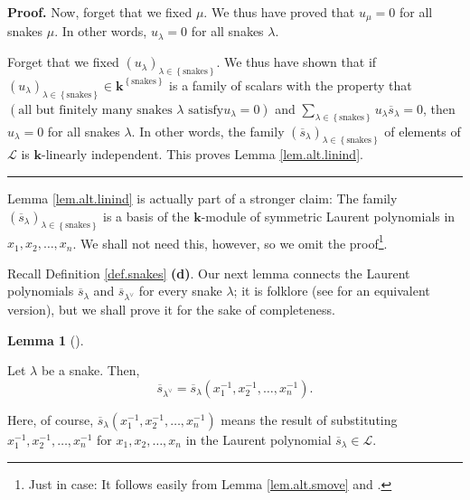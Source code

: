\documentclass[numbers=enddot,12pt,final,onecolumn,notitlepage]{scrartcl}%
\theoremstyle{definition}
\newtheorem{lem}[theo]{Lemma}
\newenvironment{lemma}[1][]
{\begin{lem}[#1]\begin{leftbar}}
{\end{leftbar}\end{lem}}
\newenvironment{proof}[1][Proof]{\noindent\textbf{#1.} }{\ \rule{0.5em}{0.5em}}
\let\sumnonlimits\sum
\renewcommand{\sum}{\sumnonlimits\limits}
\begin{document}
\begin{proof}
Now, forget that we fixed $\mu$. We thus have proved that $u_{\mu}=0$ for all
snakes $\mu$. In other words, $u_{\lambda}=0$ for all snakes $\lambda$.

Forget that we fixed $\left(  u_{\lambda}\right)  _{\lambda\in\left\{
\text{snakes}\right\}  }$. We thus have shown that if $\left(  u_{\lambda
}\right)  _{\lambda\in\left\{  \text{snakes}\right\}  }\in\mathbf{k}^{\left\{
\text{snakes}\right\}  }$ is a family of scalars with the property that
\newline$\left(  \text{all but finitely many snakes }\lambda\text{ satisfy
}u_{\lambda}=0\right)  $ and $\sum_{\lambda\in\left\{  \text{snakes}\right\}
}u_{\lambda}\overline{s}_{\lambda}=0$, then $u_{\lambda}=0$ for all snakes
$\lambda$. In other words, the family $\left(  \overline{s}_{\lambda}\right)
_{\lambda\in\left\{  \text{snakes}\right\}  }$ of elements of $\mathcal{L}$ is
$\mathbf{k}$-linearly independent. This proves Lemma \ref{lem.alt.linind}.
\end{proof}

Lemma \ref{lem.alt.linind} is actually part of a stronger claim: The family
$\left(  \overline{s}_{\lambda}\right)  _{\lambda\in\left\{  \text{snakes}%
\right\}  }$ is a basis of the $\mathbf{k}$-module of symmetric Laurent
polynomials in $x_{1},x_{2},\ldots,x_{n}$. We shall not need this, however, so
we omit the proof\footnote{Just in case: It follows easily from Lemma
\ref{lem.alt.smove} and \cite[Remark 2.3.9(d)]{GriRei}.}.

Recall Definition \ref{def.snakes} \textbf{(d)}. Our next lemma connects the
Laurent polynomials $\overline{s}_{\lambda}$ and $\overline{s}_{\lambda^{\vee
}}$ for every snake $\lambda$; it is folklore (see \cite[Exercise
2.9.15(d)]{GriRei} for an equivalent version), but we shall prove it for the
sake of completeness.

\begin{lemma}
\label{lem.alt.inverses}Let $\lambda$ be a snake. Then,%
\[
\overline{s}_{\lambda^{\vee}}=\overline{s}_{\lambda}\left(  x_{1}^{-1}%
,x_{2}^{-1},\ldots,x_{n}^{-1}\right)  .
\]

\end{lemma}

Here, of course, $\overline{s}_{\lambda}\left(  x_{1}^{-1},x_{2}^{-1}%
,\ldots,x_{n}^{-1}\right)  $ means the result of substituting $x_{1}%
^{-1},x_{2}^{-1},\ldots,x_{n}^{-1}$ for $x_{1},x_{2},\ldots,x_{n}$ in the
Laurent polynomial $\overline{s}_{\lambda}\in\mathcal{L}$.
\end{document}
